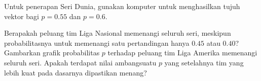 \begin{exercises}
  \item 
    Untuk penerapan Seri Dunia, gunakan komputer untuk menghasilkan tujuh
    vektor bagi $p=0.55$ dan $p=0.6$.
    \begin{exparts}
      \partsitem Berapakah peluang tim Liga Nasional memenangi seluruh seri,
        meskipun probabilitasnya untuk memenangi satu pertandingan hanya
        $0.45$ atau $0.40$?
      \partsitem Gambarkan grafik probabilitas $p$ terhadap peluang tim Liga
        Amerika memenangi seluruh seri.
        Apakah terdapat nilai ambang\Dash suatu $p$ yang setelahnya tim yang
        lebih kuat pada dasarnya dipastikan menang?
    \end{exparts}
\end{exercises}
